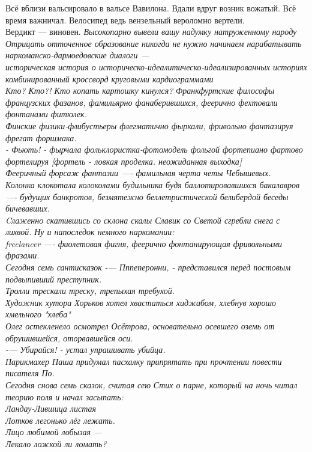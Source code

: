 \begin{flushleft}
{    Всё вблизи вальсировало в вальсе Вавилона. Вдали вдруг возник вожатый. Всё время важничал.
    Велосипед ведь вензельный вероломно вертели.\\
    Вердикт — виновен.}
    \emph{Высокопарно вывели вашу надумку натруженному народу}
    \emph{Отрицать отточенное образование никогда не нужно}
    \emph{начинаем нарабатывать наркоманско-дармоедовские диалоги ---\\
    историческая история о историческо-идеалитическо-идеализированных историях\\
    комбинированный кроссворд круговыми кардиограммами\\
    Кто? Кто?! Кто копать картошку кинулся?}
    \emph{Франкфуртские философы французских фазанов, фамильярно фанаберившихся, феерично фехтовали фонтанами фитюлек.\\
    Финские физики-флибустьеры флегматично фыркали, фривольно фантазируя фрегат форшмака.\\
    - Фьють! - фырчала фольклористка-фотомодель фольгой фортепиано фартово фортелируя 
        [фортель - ловкая проделка. неожиданная выходка]\\
    Фееричный форсаж фантазии —- фамильная черта четы Чебышевых.\\
    Колонка клокотала колоколами будильника будя баллотировавшихся бакалавров —- будущих банкротов, безмятежно беллетристической белибердой беседы бичевавших.\\
    Cлаженно скатившись со склона скалы Славик со Светой сгребли снега с лихвой.}
    \emph{Ну и напоследок немного наркомании:\\
    freelancer —- фиолетовая фигня, феерично фонтанирующая фривольными фразами.\\
    Сегодня семь сантисказок}
    \emph{-— Пппеперонни, - представился перед постовым подвыпивший преступник.\\
    Тролли трескали треску, трепыхая требухой.\\
    Художник хутора Хорьков хотел хвастаться хиджабом, хлебнув хорошо хмельного "хлеба"\\
    Олег остекленело осмотрел Осётрова, основательно осевшего оземь от обрушившейся, оторвавшейся оси.\\
    -— Убирайся! - устал упрашивать убийца.\\
    Парикмахер Паша придумал пасхалку припрятать при прочтении повести писателя По.\\
    Сегодня снова семь сказок, считая сею}
    \emph{Стих о парне, который на ночь читал теорию поля и начал засыпать:\\
    Ландау-Лившица листая\\
    Лотков легонько лёг лежать.\\
    Лицо любимой лобызая ---\\
    Лекало ложкой ли ломать?}


\end{flushleft}
